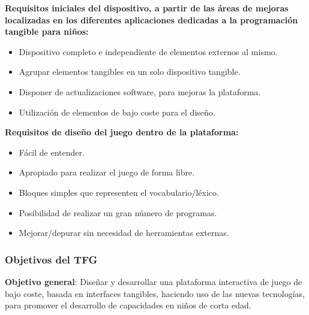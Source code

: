 \textbf{Requisitos iniciales del dispositivo, a partir de las áreas de mejoras localizadas en los diferentes aplicaciones dedicadas a la programación tangible para niños:}\\
\begin{itemize}
\item Dispositivo completo e independiente de elementos externos al mismo.
\item Agrupar elementos tangibles en un solo dispositivo tangible.
\item Disponer de actualizaciones software, para mejoras la plataforma.
\item Utilización de elementos de bajo coste para el diseño.
\end{itemize}



\textbf{Requisitos de diseño del juego dentro de la plataforma:}
\begin{itemize}
\item Fácil de entender.
\item Apropiado para realizar el juego de forma libre.
\item Bloques simples que representen el vocabulario/léxico.
\item Posibilidad de realizar un gran número de programas.
\item Mejorar/depurar sin necesidad de herramientas externas.
\end{itemize}

\subsubsection{Objetivos del TFG}

\textbf{Objetivo general}: Diseñar y desarrollar una plataforma interactiva de juego de bajo coste, basada en interfaces tangibles, haciendo uso de las nuevas tecnologías, para promover el desarrollo de capacidades en niños de corta edad.

